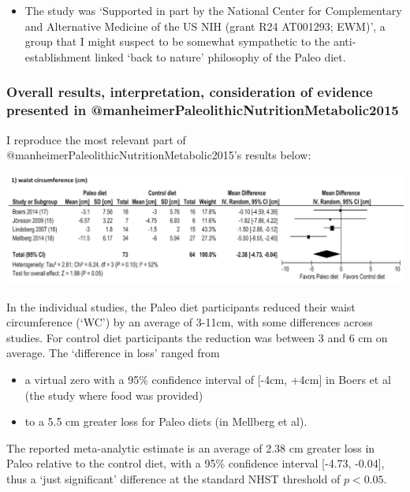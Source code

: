 \documentclass[]{article}
\providecommand{\tightlist}{%
  \setlength{\itemsep}{0pt}\setlength{\parskip}{0pt}}
\begin{document}
\begin{itemize}
\tightlist
\item
  The study was `Supported in part by the National Center for
  Complementary and Alternative Medicine of the US NIH (grant R24
  AT001293; EWM)', a group that I might suspect to be somewhat
  sympathetic to the anti-establishment linked `back to nature'
  philosophy of the Paleo diet.
\end{itemize}

\hypertarget{overall-results-interpretation-consideration-of-evidence-presented-in-manheimerpaleolithicnutritionmetabolic2015}{%
\subsubsection{Overall results, interpretation, consideration of
evidence presented in
@manheimerPaleolithicNutritionMetabolic2015}\label{overall-results-interpretation-consideration-of-evidence-presented-in-manheimerpaleolithicnutritionmetabolic2015}}

I reproduce the most relevant part of
@manheimerPaleolithicNutritionMetabolic2015's results below:

\includegraphics{waist_manheim.png}

In the individual studies, the Paleo diet participants reduced their
waist circumference (`WC') by an average of 3-11cm, with some
differences across studies. For control diet participants the reduction
was between 3 and 6 cm on average. The `difference in loss' ranged from

\begin{itemize}
\tightlist
\item
  a virtual zero with a 95\% confidence interval of {[}-4cm, +4cm{]} in
  Boers et al (the study where food was provided)
\item
  to a 5.5 cm greater loss for Paleo diets (in Mellberg et al).
\end{itemize}

The reported meta-analytic estimate is an average of 2.38 cm greater
loss in Paleo relative to the control diet, with a 95\% confidence
interval {[}-4.73, -0.04{]}, thus a `just significant' difference at the
standard NHST threshold of \(p<0.05\).
\end{document}
